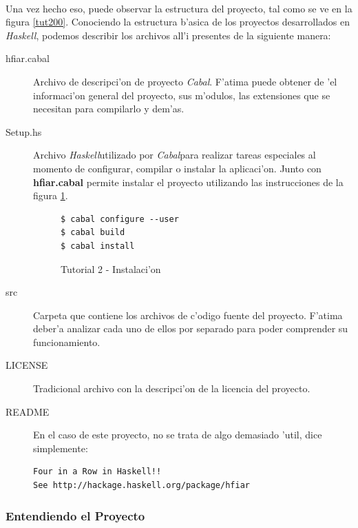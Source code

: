 \documentclass[a4paper]{article}
\newcommand{\haskell}{\textsl{Haskell}}
\newcommand{\cabal}{\textsl{Cabal}}
\begin{document}
\paragraph{}Una vez hecho eso, puede observar la estructura del proyecto, tal como se ve en la figura \ref{tut200}.  Conociendo la estructura b'asica de los proyectos desarrollados en \haskell, podemos describir los archivos all'i presentes de la siguiente manera:
\begin{description}
\item[hfiar.cabal] Archivo de descripci'on de proyecto \cabal.  F'atima puede obtener de 'el informaci'on general del proyecto, sus m'odulos, las extensiones que se necesitan para compilarlo y dem'as.  
\lstset{language=haskell, frame=single, tabsize=4}
\item[Setup.hs] Archivo \haskell utilizado por \cabal para realizar tareas especiales al momento de configurar, compilar o instalar la aplicaci'on.  Junto con \textbf{hfiar.cabal} permite instalar el proyecto utilizando las instrucciones de la figura \ref{tut201}.
\begin{figure}[hp]
	\begin{center}
		\begin{center}\begin{lstlisting}
$ cabal configure --user
$ cabal build
$ cabal install
		\end{lstlisting}\end{center}
		\caption{Tutorial 2 - Instalaci'on}
		\label{tut201}
	\end{center}
\end{figure}
\item[src] Carpeta que contiene los archivos de c'odigo fuente del proyecto.  F'atima deber'a analizar cada uno de ellos por separado para poder comprender su funcionamiento.
\item[LICENSE] Tradicional archivo con la descripci'on de la licencia del proyecto.
\item[README] En el caso de este proyecto, no se trata de algo demasiado 'util, dice simplemente:
\begin{verbatim}
Four in a Row in Haskell!!
See http://hackage.haskell.org/package/hfiar
\end{verbatim}
\end{description}

\newpage
\subsubsection{Entendiendo el Proyecto}
\end{document}
